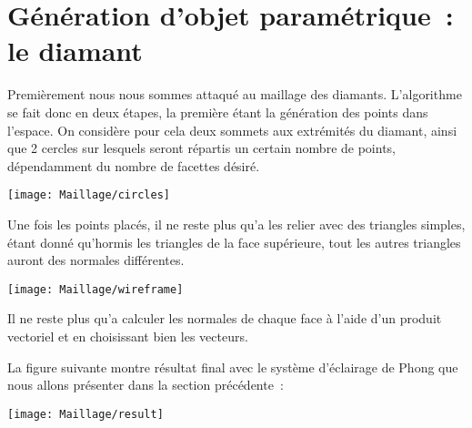 \section{Génération d'objet paramétrique~: le diamant}

Premièrement nous nous sommes attaqué au maillage des diamants.
L'algorithme se fait donc en deux étapes, la première étant la génération des points dans l'espace.
On considère pour cela deux sommets aux extrémités du diamant, ainsi que 2 cercles sur lesquels
seront répartis un certain nombre de points, dépendamment du nombre de facettes désiré.

{\centering
\texttt{[image: Maillage/circles]}}

Une fois les points placés, il ne reste plus qu'a les relier avec des triangles simples, étant donné
qu'hormis les triangles de la face supérieure, tout les autres triangles auront des normales différentes.

{\centering
\texttt{[image: Maillage/wireframe]}}

Il ne reste plus qu'a calculer les normales de chaque face à l'aide d'un produit
vectoriel et en choisissant bien les vecteurs.

La figure suivante montre résultat final avec le système d'éclairage de Phong que nous
allons présenter dans la section précédente~:

{\centering
\texttt{[image: Maillage/result]}}

